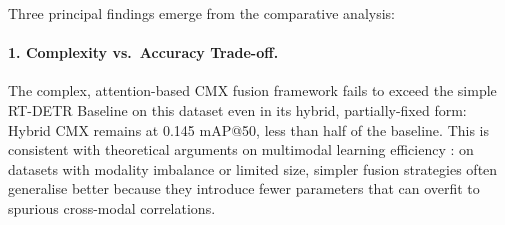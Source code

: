 \documentclass[12pt, a4paper]{article}
\begin{document}
\begin{table}[htbp]
\centering
\caption{Summary of all models evaluated in this work, confidence threshold 0.01. Best result per test condition in bold. $^\dagger$Median~[range] over 5 seeds (Section~\ref{subsec:def_detr_variance}); all other entries are single runs.}
\label{tab:summary}
\end{table}

Three principal findings emerge from the comparative analysis:

\paragraph{1. Complexity vs.\ Accuracy Trade-off.}
The complex, attention-based CMX fusion framework fails to exceed the simple RT-DETR Baseline on this dataset even in its hybrid, partially-fixed form: Hybrid CMX remains at 0.145 mAP@50, less than half of the baseline. This is consistent with theoretical arguments on multimodal learning efficiency \cite{wang2020multimodal}: on datasets with modality imbalance or limited size, simpler fusion strategies often generalise better because they introduce fewer parameters that can overfit to spurious cross-modal correlations.
\end{document}
